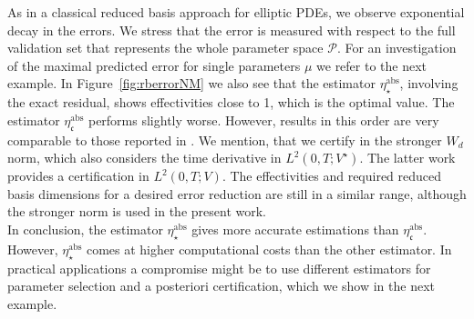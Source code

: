 \documentclass{article}
\theoremstyle{plain}
\theoremstyle{definition}
\theoremstyle{remark}
\newcommand{\RBestFineABS}{\eta_\star^\text{abs}}
\newcommand{\RBestCcABS}{\eta_\mathfrak{c}^\text{abs}}
\begin{document}
As in a classical reduced basis approach for elliptic PDEs, we observe exponential decay in the errors. We stress that the error is measured with respect to the full validation set that represents the whole parameter space $\mathcal{P}$. For an investigation of the maximal predicted error for single parameters $\mu$ we refer to the next example. In Figure~\ref{fig:rberrorNM} we also see that the estimator $\RBestFineABS$, involving the exact residual, shows effectivities close to 1, which is the optimal value. The estimator $\RBestCcABS$ performs slightly worse. However, results in this order are very comparable to those reported in \cite{Hesthaven2016}. We mention, that we certify in the stronger $W_d$ norm, which also considers the time derivative in $L^2(0,T;V^\star)$. The latter work provides a certification in $L^2(0,T;V)$. The effectivities and required reduced basis dimensions for a desired error reduction are still in a similar range, although the stronger norm is used in the present work. \\

In conclusion, the estimator $\RBestFineABS$ gives more accurate estimations than $\RBestCcABS$. However, $\RBestFineABS$ comes at higher computational costs than the other estimator. In practical applications a compromise might be to use different estimators for parameter selection and a posteriori certification, which we show in the next example.
\end{document}
